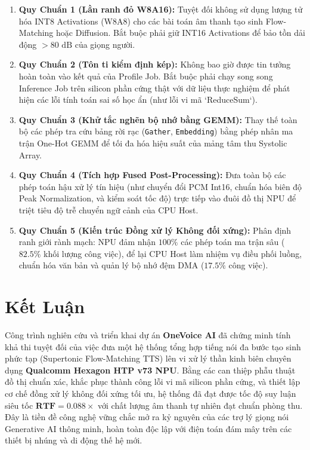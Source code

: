 \documentclass[11pt,a4paper,oneside,table]{report}
\begin{document}
\begin{contributionbox}
\begin{enumerate}
    \item \textbf{Quy Chuẩn 1 (Lằn ranh đỏ W8A16):} Tuyệt đối không sử dụng lượng tử hóa INT8 Activations (W8A8) cho các bài toán âm thanh tạo sinh Flow-Matching hoặc Diffusion. Bắt buộc phải giữ INT16 Activations để bảo tồn dải động $>80\text{ dB}$ của giọng người.
    \item \textbf{Quy Chuẩn 2 (Tôn ti kiểm định kép):} Không bao giờ được tin tưởng hoàn toàn vào kết quả của Profile Job. Bắt buộc phải chạy song song Inference Job trên silicon phần cứng thật với dữ liệu thực nghiệm để phát hiện các lỗi tính toán sai số học ẩn (như lỗi vi mã `ReduceSum`).
    \item \textbf{Quy Chuẩn 3 (Khử tắc nghẽn bộ nhớ bằng GEMM):} Thay thế toàn bộ các phép tra cứu bảng rời rạc (\texttt{Gather}, \texttt{Embedding}) bằng phép nhân ma trận One-Hot GEMM để tối đa hóa hiệu suất của mảng tâm thu Systolic Array.
    \item \textbf{Quy Chuẩn 4 (Tích hợp Fused Post-Processing):} Đưa toàn bộ các phép toán hậu xử lý tín hiệu (như chuyển đổi PCM Int16, chuẩn hóa biên độ Peak Normalization, và kiểm soát tốc độ) trực tiếp vào đuôi đồ thị NPU để triệt tiêu độ trễ chuyển ngữ cảnh của CPU Host.
    \item \textbf{Quy Chuẩn 5 (Kiến trúc Đồng xử lý Không đối xứng):} Phân định ranh giới rành mạch: NPU đảm nhận $100\%$ các phép toán ma trận sâu ($82.5\%$ khối lượng công việc), để lại CPU Host làm nhiệm vụ điều phối luồng, chuẩn hóa văn bản và quản lý bộ nhớ đệm DMA ($17.5\%$ công việc).
\end{enumerate}
\end{contributionbox}

\section{Kết Luận}
Công trình nghiên cứu và triển khai dự án \textbf{OneVoice AI} đã chứng minh tính khả thi tuyệt đối của việc đưa một hệ thống tổng hợp tiếng nói đa bước tạo sinh phức tạp (Supertonic Flow-Matching TTS) lên vi xử lý thần kinh biên chuyên dụng \textbf{Qualcomm Hexagon HTP v73 NPU}. Bằng các can thiệp phẫu thuật đồ thị chuẩn xác, khắc phục thành công lỗi vi mã silicon phần cứng, và thiết lập cơ chế đồng xử lý không đối xứng tối ưu, hệ thống đã đạt được tốc độ suy luận siêu tốc $\mathbf{RTF = 0.088\times}$ với chất lượng âm thanh tự nhiên đạt chuẩn phòng thu. Đây là tiền đề công nghệ vững chắc mở ra kỷ nguyên của các trợ lý giọng nói Generative AI thông minh, hoàn toàn độc lập với điện toán đám mây trên các thiết bị nhúng và di động thế hệ mới.
\end{document}
